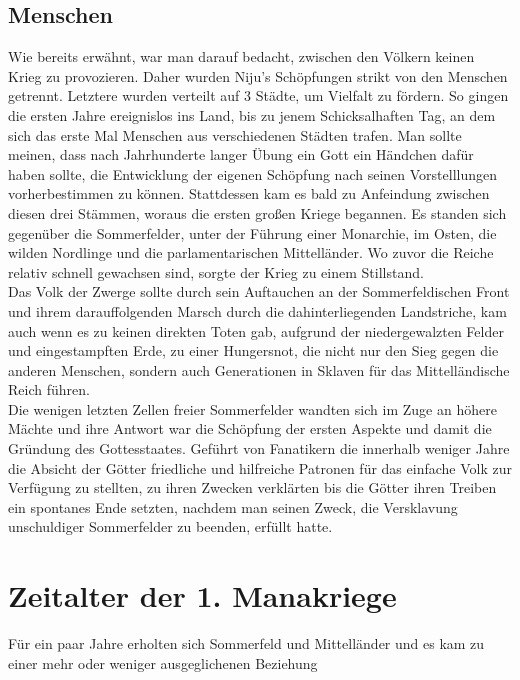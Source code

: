 \documentclass[a4paper,12pt,oneside]{book}
\begin{document}
\section{Menschen}
Wie bereits erwähnt, war man darauf bedacht, zwischen den Völkern keinen Krieg zu provozieren. Daher wurden Niju's Schöpfungen strikt von den Menschen getrennt. Letztere wurden verteilt auf 3 Städte, um Vielfalt zu fördern. So gingen die ersten Jahre ereignislos ins Land, bis zu jenem Schicksalhaften Tag, an dem sich das erste Mal Menschen aus verschiedenen Städten trafen. Man sollte meinen, dass nach Jahrhunderte langer Übung ein Gott ein Händchen dafür haben sollte, die Entwicklung der eigenen Schöpfung nach seinen Vorstelllungen vorherbestimmen zu können. Stattdessen kam es bald zu Anfeindung zwischen diesen drei Stämmen, woraus die ersten großen Kriege begannen. Es standen sich gegenüber die Sommerfelder, unter der Führung einer Monarchie, im Osten, die wilden Nordlinge und die parlamentarischen Mittelländer. Wo zuvor die Reiche relativ schnell gewachsen sind, sorgte der Krieg zu einem Stillstand.
\\Das Volk der Zwerge sollte durch sein Auftauchen an der Sommerfeldischen Front und ihrem darauffolgenden Marsch durch die dahinterliegenden Landstriche, kam auch wenn es zu keinen direkten Toten gab, aufgrund der niedergewalzten Felder und eingestampften Erde, zu einer Hungersnot, die nicht nur den Sieg gegen die anderen Menschen, sondern auch Generationen in Sklaven für das Mittelländische Reich führen.
\\Die wenigen letzten Zellen freier Sommerfelder wandten sich im Zuge an höhere Mächte und ihre Antwort war die Schöpfung der ersten Aspekte und damit die Gründung des Gottesstaates. Geführt von Fanatikern die innerhalb weniger Jahre die Absicht der Götter friedliche und hilfreiche Patronen für das einfache Volk zur Verfügung zu stellten, zu ihren Zwecken verklärten bis die Götter ihren Treiben ein spontanes Ende setzten, nachdem man seinen Zweck, die Versklavung unschuldiger Sommerfelder zu beenden, erfüllt hatte.
\chapter{Zeitalter der 1. Manakriege}
Für ein paar Jahre erholten sich Sommerfeld und Mittelländer und es kam zu einer mehr oder weniger ausgeglichenen Beziehung  
\end{document}
